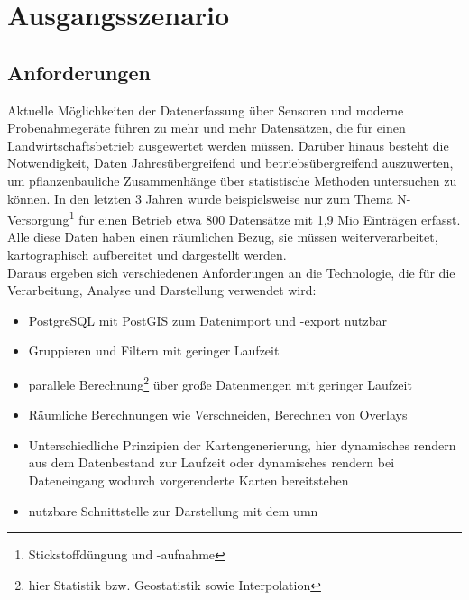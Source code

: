 \chapter{Ausgangsszenario}
\label{chapter:ausgangsszenario}

\section{Anforderungen}
\label{Anforderungen}

Aktuelle Möglichkeiten der Datenerfassung über Sensoren und moderne Probenahmegeräte führen zu mehr und mehr Datensätzen, die für einen Landwirtschaftsbetrieb ausgewertet werden müssen. Darüber hinaus besteht die Notwendigkeit, Daten Jahresübergreifend und betriebsübergreifend auszuwerten, um pflanzenbauliche Zusammenhänge über statistische Methoden untersuchen zu können.
In den letzten 3 Jahren wurde beispielsweise nur zum Thema N-Versorgung\footnote{Stickstoffdüngung und -aufnahme} für einen Betrieb etwa 800 Datensätze mit 1,9 Mio Einträgen erfasst. Alle diese Daten haben einen räumlichen Bezug, sie müssen weiterverarbeitet, kartographisch aufbereitet und dargestellt werden.\\
Daraus ergeben sich verschiedenen Anforderungen an die Technologie, die für die Verarbeitung, Analyse und Darstellung verwendet wird:
\begin{itemize}
\item PostgreSQL mit PostGIS zum Datenimport und -export nutzbar
\item Gruppieren und Filtern mit geringer Laufzeit
\item parallele Berechnung\footnote{hier Statistik bzw. Geostatistik sowie Interpolation} über große Datenmengen mit geringer Laufzeit
\item Räumliche Berechnungen wie Verschneiden, Berechnen von Overlays
\item  Unterschiedliche Prinzipien der Kartengenerierung, hier dynamisches rendern aus dem Datenbestand zur Laufzeit oder dynamisches rendern bei Dateneingang wodurch vorgerenderte Karten bereitstehen %
\item nutzbare Schnittstelle zur Darstellung mit dem \Gls{umn}
\end{itemize}



